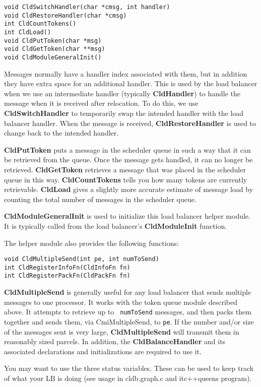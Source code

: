 \begin{verbatim}
void CldSwitchHandler(char *cmsg, int handler)
void CldRestoreHandler(char *cmsg)
int CldCountTokens()
int CldLoad()
void CldPutToken(char *msg)
void CldGetToken(char **msg)
void CldModuleGeneralInit()
\end{verbatim}

Messages normally have a handler index associated with them, but in addition
they have extra space for an additional handler.  This is used by the
load balancer when we use an intermediate handler (typically {\bf
CldHandler}) to handle the message when it is received after
relocation.  To do this, we use {\bf CldSwitchHandler} to temporarily
swap the intended handler with the load balancer handler.  When the
message is received, {\bf CldRestoreHandler} is used to change back to
the intended handler. 

{\bf CldPutToken} puts a message in the scheduler queue in such a way
that it can be retrieved from the queue. Once the message gets
handled, it can no longer be retrieved.  {\bf CldGetToken} retrieves a
message that was placed in the scheduler queue in this way.
{\bf CldCountTokens} tells you how many tokens are currently
retrievable. {\bf CldLoad} gives a slightly more accurate estimate of
message load by counting the total number of messages in the
scheduler queue.

{\bf CldModuleGeneralInit} is used to initialize this load balancer
helper module.  It is typically called from the load balancer's {\bf
CldModuleInit} function.

The helper module also provides the following functions:

\begin{verbatim}
void CldMultipleSend(int pe, int numToSend)
int CldRegisterInfoFn(CldInfoFn fn)
int CldRegisterPackFn(CldPackFn fn)
\end{verbatim}

{\bf CldMultipleSend} is generally useful for any load balancer that
sends multiple messages to one processor.  It works with the token
queue module described above.  It attempts to retrieve up to {\tt
numToSend} messages, and then packs them together and sends them, via
CmiMultipleSend, to {\tt pe}.  If the number and/or size of the
messages sent is very large, {\bf CldMultipleSend} will transmit them
in reasonably sized parcels.  In addition, the {\bf CldBalanceHandler} and
its associated declarations and initializations are required to use it.

You may want to use the three status variables.  These can be used to
keep track of what your LB is doing (see usage in cldb.graph.c and
itc++queens program).

